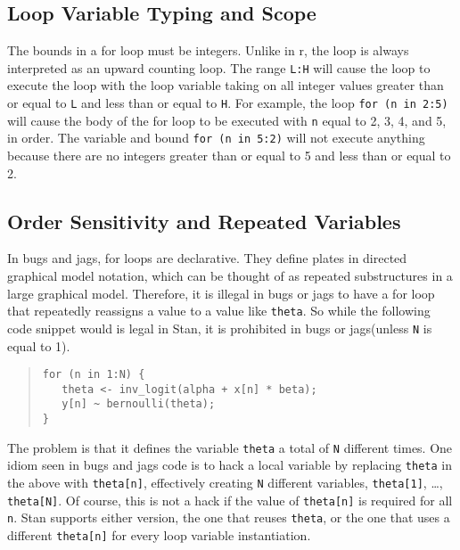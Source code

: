 \documentclass[10pt]{report}
\newcommand{\Stan}{Stan\xspace}
\newcommand{\acronym}[1]{{\sc #1}\xspace}
\newcommand{\R}{\acronym{r}}
\newcommand{\BUGS}{\acronym{bugs}}
\newcommand{\JAGS}{\acronym{jags}}
\newcommand{\code}[1]{{\tt #1}}
\begin{document}
\subsection{Loop Variable Typing and Scope}

The bounds in a for loop must be integers.  Unlike in \R, the loop is
always interpreted as an upward counting loop.  The range \code{L:H}
will cause the loop to execute the loop with the loop variable taking
on all integer values greater than or equal to \code{L} and less than
or equal to \code{H}.  For example, the loop \code{for (n in 2:5)}
will cause the body of the for loop to be executed with \code{n} equal
to 2, 3, 4, and 5, in order.  The variable and bound \code{for (n in
  5:2)} will not execute anything because there are no integers
greater than or equal to 5 and less than or equal to 2.

\subsection{Order Sensitivity and Repeated Variables}

In \BUGS and \JAGS, for loops are declarative.  They define plates in
directed graphical model notation, which can be thought of as repeated
substructures in a large graphical model.  Therefore, it is illegal in
\BUGS or \JAGS to have a for loop that repeatedly reassigns a value to
a value like \code{theta}.  So while the following code snippet would
is legal in \Stan, it is prohibited in \BUGS or \JAGS (unless \code{N}
is equal to 1).
%
\begin{quote}
\begin{Verbatim} 
for (n in 1:N) {
   theta <- inv_logit(alpha + x[n] * beta);
   y[n] ~ bernoulli(theta);
}
\end{Verbatim}
\end{quote}
% 
The problem is that it defines the variable \code{theta} a total of
\code{N} different times.  One idiom seen in \BUGS and \JAGS code is
to hack a local variable by replacing \code{theta} in the above with
\code{theta[n]}, effectively creating \code{N} different variables,
\code{theta[1]}, \ldots, \code{theta[N]}.  Of course, this is not a
hack if the value of \code{theta[n]} is required for all \code{n}.
\Stan supports either version, the one that reuses \code{theta}, or
the one that uses a different \code{theta[n]} for every loop variable
instantiation.  
\end{document}
